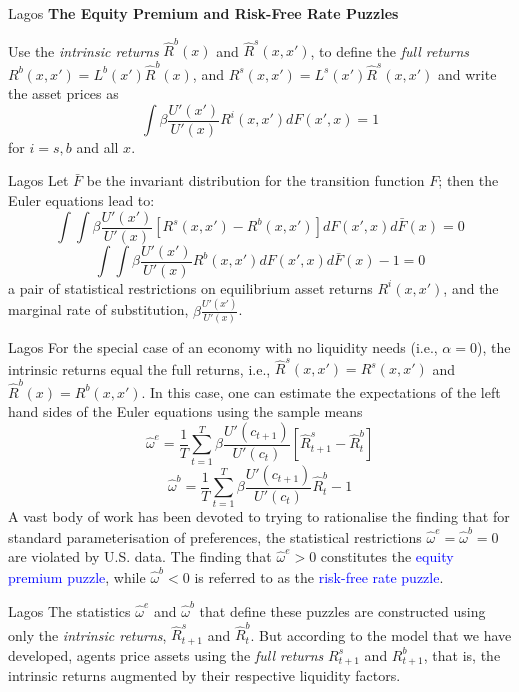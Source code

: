 \documentclass[aspectratio=169,xcolor=dvipsnames]{beamer}
\begin{document}
\begin{frame}{Lagos}
    \textbf{The Equity Premium and Risk-Free Rate Puzzles}

    Use the \emph{intrinsic returns} $\hat R^b(x)$ and $\hat R^s(x, x')$, to define the \emph{full returns} $R^b(x, x') = L^b(x') \hat R^b(x)$, and $R^s(x, x') = L^s(x') \hat R^s(x, x')$ and write the asset prices as
    \[
        \int \beta \frac{U'(x')}{U'(x)} R^i(x, x') dF(x', x) = 1
    \]
    for $i = s, b$ and all $x$.
\end{frame}

\begin{frame}{Lagos}
    Let $\bar F$ be the invariant distribution for the transition function $F$; then the Euler equations lead to:
    \[
        \int \int \beta \frac{U'(x')}{U'(x)} [R^s(x, x') - R^b(x, x')] dF(x', x) d\bar F(x) = 0
    \]
    \[
        \int \int \beta \frac{U'(x')}{U'(x)} R^b(x, x') dF(x', x) d\bar F(x) - 1 = 0
    \]
    a pair of statistical restrictions on equilibrium asset returns $R^i(x, x')$, and the marginal rate of substitution, $\beta \frac{U'(x')}{U'(x)}$.
\end{frame}

\begin{frame}{Lagos}
    For the special case of an economy with no liquidity needs (i.e., $\alpha = 0$), the intrinsic returns equal the full returns, i.e., $\hat R^s(x, x') = R^s(x, x')$ and $\hat R^b(x) = R^b(x, x')$. In this case, one can estimate the expectations of the left hand sides of the Euler equations using the sample means
    \[
        \hat \omega^e = \frac{1}{T} \sum_{t=1}^T \beta \frac{U'(c_{t+1})}{U'(c_t)} [\hat R^s_{t+1} - \hat R^b_t]
    \]
    \[
        \hat \omega^b = \frac{1}{T} \sum_{t=1}^T \beta \frac{U'(c_{t+1})}{U'(c_t)} \hat R^b_t - 1
    \]
    A vast body of work has been devoted to trying to rationalise the finding that for standard parameterisation of preferences, the statistical restrictions $\hat \omega^e = \hat \omega^b = 0$ are violated by U.S. data. The finding that $\hat \omega^e > 0$ constitutes the \textcolor{blue}{equity premium puzzle}, while $\hat \omega^b < 0$ is referred to as the \textcolor{blue}{risk-free rate puzzle}.
\end{frame}

\begin{frame}{Lagos}
    The statistics $\hat \omega^e$ and $\hat \omega^b$ that define these puzzles are constructed using only the \emph{intrinsic returns}, $\hat R^s_{t+1}$ and $\hat R^b_t$. But according to the model that we have developed, agents price assets using the \emph{full returns} $R^s_{t+1}$ and $R^b_{t+1}$, that is, the intrinsic returns augmented by their respective liquidity factors.
\end{frame}
\end{document}
